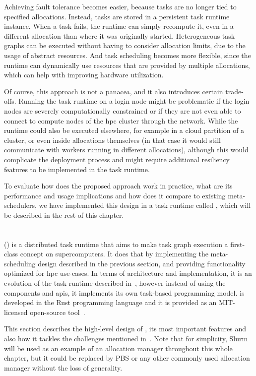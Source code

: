 Achieving fault tolerance becomes easier, because tasks are no longer tied to specified
allocations. Instead, tasks are stored in a persistent task runtime instance. When a task fails,
the runtime can simply recompute it, even in a different allocation than where it was originally
started. Heterogeneous task graphs can be executed without having to consider allocation limits,
due to the usage of abstract resources. And task scheduling becomes more flexible, since the
runtime can dynamically use resources that are provided by multiple allocations, which can help
with improving hardware utilization.

Of course, this approach is not a panacea, and it also introduces certain trade-offs. Running the
task runtime on a login node might be problematic if the login nodes are severely computationally
constrained or if they are not even able to connect to compute nodes of the \gls{hpc}
cluster through the network. While the runtime could also be executed elsewhere, for example in a
cloud partition of a cluster, or even inside allocations themselves (in that case it would still
communicate with workers running in different allocations), although this would complicate the
deployment process and might require additional resiliency features to be implemented in the task
runtime.

To evaluate how does the proposed approach work in practice, what are its performance and usage
implications and how does it compare to existing meta-schedulers, we have implemented this design
in a task runtime called \hyperqueue{}, which will be described in the rest of this
chapter.

\section{\hyperqueue{}}
\hyperqueue{} (\hq{}) is a distributed task runtime that aims to make task graph execution a
first-class concept on supercomputers. It does that by implementing the meta-scheduling design
described in the previous section, and providing functionality optimized for \gls{hpc}
use-cases. In terms of architecture and implementation, it is an evolution of the
\rsds{} task runtime described in~, however instead of using
the \dask{} components and \glspl{api}, it implements its own task-based
programming model. \hyperqueue{} is developed in the Rust programming language and it is
provided as an \mbox{MIT-licensed} open-source tool~\cite{hq_github}.

This section describes the high-level design of \hyperqueue{}, its most important features
and also how it tackles the challenges mentioned in~. Note that for
simplicity, Slurm will be used as an example of an allocation manager throughout this whole
chapter, but it could be replaced by PBS or any other commonly used allocation manager without the
loss of generality.

